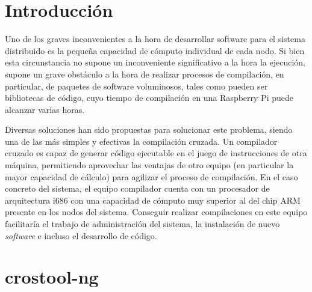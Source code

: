 \documentclass{article}
\title{\hmwkTitle}
\author{\textbf{\hmwkAuthorName}}
\date{21 de abril de 2015}
\begin{document}
\maketitle


\setcounter{tocdepth}{1}

\newpage
\tableofcontents
\newpage


\section{Introducción}

Uno de los graves inconvenientes a la hora de desarrollar software para el sistema distribuido es la pequeña capacidad de cómputo individual de cada nodo. Si bien esta circunstancia no supone un inconveniente significativo a la hora la ejecución, supone un grave obstáculo a la hora de realizar procesos de compilación, en particular, de paquetes de software voluminosos, tales como pueden ser bibliotecas de código, cuyo tiempo de compilación en una Raspberry Pi puede alcanzar varias horas.

Diversas soluciones han sido propuestas para solucionar este problema, siendo una de las más simples y efectivas la compilación cruzada. Un compilador cruzado es capaz de generar código ejecutable en el juego de instrucciones de otra máquina, permitiendo aprovechar las ventajas de otro equipo (en particular la mayor capacidad de cálculo) para agilizar el proceso de compilación. En el caso concreto del sistema, el equipo compilador cuenta con un procesador de arquitectura i686 con una capacidad de cómputo muy superior al del chip ARM presente en los nodos del sistema. Conseguir realizar compilaciones en este equipo facilitaría el trabajo de administración del sistema, la instalación de nuevo \textit{software} e incluso el desarrollo de código.

\section{crostool-ng}

\end{document}
